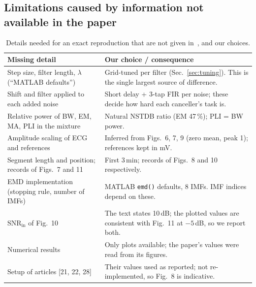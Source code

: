 \documentclass[11pt,a4paper]{article}
\newcommand{\snrin}{\mathrm{SNR}_\mathrm{in}}
\begin{document}
\subsection{Limitations caused by information not available in the paper}
\label{sec:limits}
\begin{table}[!htbp]
\centering\small
\caption{Details needed for an exact reproduction that are not given in~\cite{dai}, and our choices.}
\label{tab:missing}
\begin{tabular}{p{4.6cm}p{11.2cm}}
\toprule
Missing detail & Our choice / consequence\\
\midrule
Step size, filter length, $\lambda$ (``MATLAB defaults'') & Grid-tuned per filter (Sec.~\ref{sec:tuning}). This is the single largest source of difference.\\
Shift and filter applied to each added noise & Short delay + 3-tap FIR per noise; these decide how hard each canceller's task is.\\
Relative power of BW, EM, MA, PLI in the mixture & Natural NSTDB ratio (EM 47\,\%); PLI = BW power.\\
Amplitude scaling of ECG and references & Inferred from Figs.~6, 7, 9 (zero mean, peak 1); references kept in mV.\\
Segment length and position; records of Figs.~7 and 11 & First 3\,min; records of Figs.~8 and 10 respectively.\\
EMD implementation (stopping rule, number of IMFs) & MATLAB \texttt{emd()} defaults, 8 IMFs. IMF indices depend on these.\\
$\snrin$ of Fig.~10 & The text states 10\,dB; the plotted values are consistent with Fig.~11 at $-5$\,dB, so we report both.\\
Numerical results & Only plots available; the paper's values were read from its figures.\\
Setup of articles [21, 22, 28] & Their values used as reported; not re-implemented, so Fig.~8 is indicative.\\
\bottomrule
\end{tabular}
\end{table}
\end{document}
